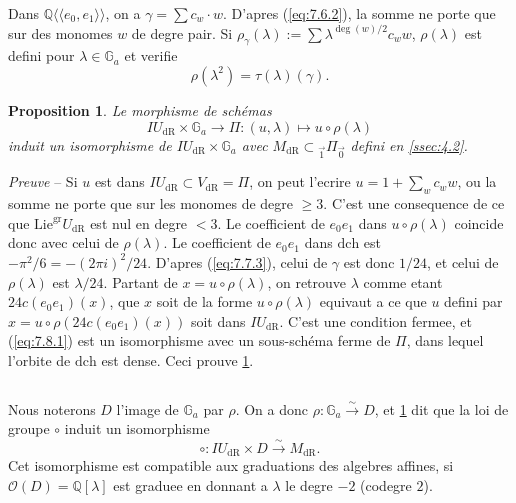 \documentclass[11pt,a4paper]{article}
\theoremstyle{plain}
\newtheorem{proposition}[theorem]{Proposition}
\theoremstyle{definition}
\newcommand{\Q}{\mathbb{Q}}
\newcommand{\Ga}{\mathbb{G}_a}
\newcommand{\dR}{\mathrm{dR}}
\newcommand{\gr}{\mathrm{gr}}
\begin{document}
Dans $\Q\langle\langle e_0,e_1 \rangle\rangle$, on a $\gamma = \sum c_w \cdot w$. D'apres (\ref{eq:7.6.2}), la somme ne porte que sur des monomes $w$ de degre pair. Si $\rho_{\gamma}(\lambda) := \sum \lambda^{\deg(w)/2} c_w w$, $\rho(\lambda)$ est defini pour $\lambda \in \Ga$ et verifie
\begin{equation}\label{eq:7.7.3}
\rho(\lambda^2) = \tau(\lambda)(\gamma).
\end{equation}

\begin{proposition}\label{prop:7.8}
Le morphisme de sch\'emas
\begin{equation}\label{eq:7.8.1}
IU_{\dR} \times \Ga \to \Pi: (u, \lambda) \mapsto u \circ \rho(\lambda)
\end{equation}
induit un isomorphisme de $IU_{\dR} \times \Ga$ avec $M_{\dR} \subset {}_{\vec{1}}\Pi_{\vec{0}}$ defini en \ref{ssec:4.2}.
\end{proposition}

\noindent \textit{Preuve} -- Si $u$ est dans $IU_{\dR} \subset V_{\dR} = \Pi$, on peut l'ecrire $u = 1 + \sum_w c_w w$, ou la somme ne porte que sur les monomes de degre $\geq 3$. C'est une consequence de ce que $\mathrm{Lie}^{\gr} U_{\dR}$ est nul en degre $< 3$. Le coefficient de $e_0 e_1$ dans $u \circ \rho(\lambda)$ coincide donc avec celui de $\rho(\lambda)$. Le coefficient de $e_0 e_1$ dans $\mathrm{dch}$ est $-\pi^2/6 = -(2\pi i)^2/24$. D'apres (\ref{eq:7.7.3}), celui de $\gamma$ est donc $1/24$, et celui de $\rho(\lambda)$ est $\lambda/24$. Partant de $x = u \circ \rho(\lambda)$, on retrouve $\lambda$ comme etant $24 c(e_0 e_1)(x)$, que $x$ soit de la forme $u \circ \rho(\lambda)$ equivaut a ce que $u$ defini par $x = u \circ \rho(24 c(e_0 e_1)(x))$ soit dans $IU_{\dR}$. C'est une condition fermee, et (\ref{eq:7.8.1}) est un isomorphisme avec un sous-sch\'ema ferme de $\Pi$, dans lequel l'orbite de $\mathrm{dch}$ est dense. Ceci prouve \ref{prop:7.8}.

\subsection{}\label{ssec:7.9}

Nous noterons $D$ l'image de $\Ga$ par $\rho$. On a donc $\rho: \Ga \xrightarrow{\sim} D$, et \ref{prop:7.8} dit que la loi de groupe $\circ$ induit un isomorphisme
\begin{equation}\label{eq:7.9.1}
\circ: IU_{\dR} \times D \xrightarrow{\sim} M_{\dR}.
\end{equation}
Cet isomorphisme est compatible aux graduations des algebres affines, si $\mathcal{O}(D) = \Q[\lambda]$ est graduee en donnant a $\lambda$ le degre $-2$ (codegre $2$).
\end{document}
